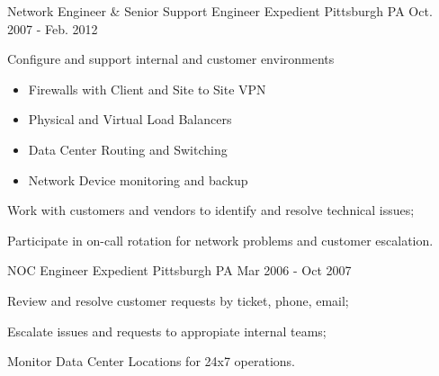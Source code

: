 \begin{cventries}

\cventry
{Network Engineer \& Senior Support Engineer} %
{Expedient} %
{Pittsburgh PA} %
{Oct. 2007 - Feb. 2012} %
{ %
\begin{cvitems}
\item Configure and support internal and customer environments
  \begin{itemize}%
  \item Firewalls with Client and Site to Site VPN
  \item Physical and Virtual Load Balancers
  \item Data Center Routing and Switching
  \item Network Device monitoring and backup
  \end{itemize}
\item Work with customers and vendors to identify and resolve technical issues;
\item Participate in on-call rotation for network problems and customer escalation.
\end{cvitems} 
}


\cventry
{NOC Engineer} %
{Expedient} %
{Pittsburgh PA} %
{Mar 2006 - Oct 2007} %
{ %
\begin{cvitems}
\item Review and resolve customer requests by ticket, phone, email;
\item Escalate issues and requests to appropiate internal teams;
\item Monitor Data Center Locations for 24x7 operations.
\end{cvitems}
}

\end{cventries}
